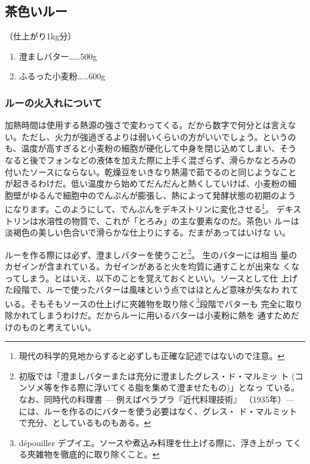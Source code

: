 \documentclass[twoside,12Q,b5paper,tombo]{escoffierltjsbook}
\def\tightlist{\itemsep1pt\parskip0pt\parsep0pt}
\newenvironment{recette}{\begin{multicols}{2}}{\end{multicols}}
\begin{document}
\begin{recette}

\subsection{茶色いルー}\label{ux8336ux8272ux3044ux30ebux30fc}

（仕上がり1kg分）

\begin{enumerate}
\def\labelenumi{\arabic{enumi}.}
\tightlist
\item
  澄ましバター\ldots{}\ldots{}500g
\item
  ふるった小麦粉\ldots{}\ldots{}600g
\end{enumerate}

\subsubsection{ルーの火入れについて}\label{ux30ebux30fcux306eux706bux5165ux308cux306bux3064ux3044ux3066}

加熱時間は使用する熱源の強さで変わってくる。だから数字で何分とは言えな
い。ただし、火力が強過ぎるよりは弱いくらいの方がいいでしょう。というの
も、温度が高すぎると小麦粉の細胞が硬化して中身を閉じ込めてしまい、そう
なると後でフォンなどの液体を加えた際に上手く混ざらず、滑らかなとろみの
付いたソースにならない。乾燥豆をいきなり熱湯で茹でるのと同じようなこと
が起きるわけだ。低い温度から始めてだんだんと熱くしていけば、小麦粉の細
胞壁がゆるんで細胞中のでんぷんが膨張し、熱によって発酵状態の初期のよう
になります。このようにして、でんぷんをデキストリンに変化させる\footnote{現代の科学的見地からすると必ずしも正確な記述ではないので注意。}。
デキストリンは水溶性の物質で、これが「とろみ」の主な要素なのだ。茶色い
ルーは淡褐色の美しい色合いで滑らかな仕上りにする。だまがあってはいけな
い。

ルーを作る際には必ず、澄ましバターを使うこと\footnote{初版では「澄ましバターまたは充分に澄ましたグレス・ド・マルミッ
  ト (コンソメ等を作る際に浮いてくる脂を集めて澄ませたもの)」となっ
  ている。なお、同時代の料理書 --- 例えばペラプラ『近代料理技術』
  （1935年）--- には、ルーを作るのにバターを使う必要はなく、グレス・
  ド・マルミットで充分、としているものもある。}。 生のバターには相当
量のカゼインが含まれている。カゼインがあると火を均質に通すことが出来な
くなってしまう。とはいえ、以下のことを覚えておくといい。ソースとして仕
上げた段階で、ルーで使ったバターは風味という点ではほとんど意味が失なわ
れている。そもそもソースの仕上げに夾雑物を取り除く\footnote{dépouiller
  デプイエ。ソースや煮込み料理を仕上げる際に、浮き上がっ
  てくる夾雑物を徹底的に取り除くこと。}段階でバターも
完全に取り除かれてしまうわけだ。だからルーに用いるバターは小麦粉に熱を
通すためだけのものと考えていい。


\end{recette}
\end{document}

